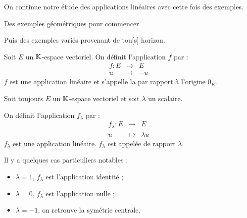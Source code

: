 







\debuttexte


\diapo

\change

On continue notre étude des applications linéaires avec cette fois des exemples.

\change

Des exemples géométriques pour commencer

\change

Puis des exemples variés provenant de tou[s] horizon.



\diapo


Soit $E$ un $\mathbb{K}$-espace vectoriel. 
On définit l'application  
$f$ par :
$$\begin{array}{rcl}
f : E & \to & E \\
u & \mapsto & - u
  \end{array}$$
$f$ est une application linéaire et s'appelle la  
  par rapport à l'origine $0_E$.

  
\change


Soit toujours $E$ un $\mathbb{K}$-espace vectoriel et soit $\lambda$ un scalaire.

On définit l'application  
$f_{\lambda}$ par :
$$\begin{array}{rcl}
f_{\lambda} : E & \to & E \\
u & \mapsto & \lambda u
  \end{array}$$
$f_{\lambda}$ est une application linéaire. 
$f_{\lambda}$ est appelée  de rapport $\lambda$.


Il y a quelques cas particuliers notables :
\begin{itemize}
  \item $\lambda = 1$, $f_{\lambda}$ est l'application identité ;
  \item $\lambda = 0$, $f_{\lambda}$ est l'application nulle ;
  \item $\lambda = -1$, on retrouve la symétrie centrale.
\end{itemize}

\change

